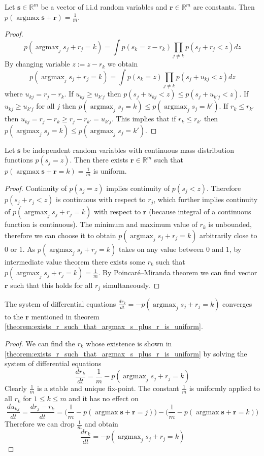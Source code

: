 \documentclass[oneside,english,logo]{amuthesis}
\DeclareMathOperator*{\argmax}{argmax}
\begin{document}
\begin{theorem}
Let $\boldsymbol{s} \in \mathbb{R}^m$ be a vector of i.i.d random variables and $\boldsymbol{r}\in \mathbb{R}^m$ are constants. Then $p(\argmax \boldsymbol{s}+\boldsymbol{r}) = \frac{1}{m}$. 
\end{theorem}
\begin{proof}
\[
p(\argmax_j s_j+r_j=k) = \int p(s_k=z-r_k)\prod_{j\ne k} p(s_j+r_j< z) dz
\] 
By changing variable  $z := z-r_k$ we obtain
\[	
p(\argmax_j s_j+r_j=k) = \int  p(s_k=z) \prod_{j\ne k} p(s_j + u_{kj} < z) dz 
\]
where $u_{kj}=r_j-r_k$. If $u_{kj} \ge u_{k'j}$ then $p(s_j + u_{kj} < z) \le p(s_j + u_{k'j}< z)$. If $u_{kj} \ge u_{k'j}$  for all $j$ then $p(\argmax_j s_j=k) \le p(\argmax_j s_j=k')$. If $r_k \le r_{k'}$ then $u_{kj} = r_j-r_k \ge r_j-r_{k'} = u_{k'j}$. This implies that if $r_k \le r_{k'}$ then $p(\argmax_j s_j=k) \le p(\argmax_j s_j=k')$. 
\end{proof}
\fi
\begin{theorem}
\label{theorem:exists_r_such_that_argmax_s_plus_r_is_uniform}
Let $\boldsymbol{s}$ be independent random variables with continuous mass distribution functions $p(s_j=z)$.
Then there exists $\boldsymbol{r} \in \mathbb{R}^m$ such that $p(\argmax \boldsymbol{s}+\boldsymbol{r}=k)=\frac{1}{m}$ is uniform.
\end{theorem}
\begin{proof}
	Continuity of $p(s_j=z)$ implies continuity of $p(s_j < z)$. Therefore $p(s_j +r_j< z)$ is continuous with respect to $r_j$, which further implies continuity of  $p(\argmax_j s_j+r_j=k)$ with respect to $\boldsymbol{r}$ (because integral of a continuous function is continuous). The minimum and maximum value of $r_k$ is unbounded, therefore we can choose it to obtain $p(\argmax_j s_j+r_j=k)$ arbitrarily close to $0$ or $1$. As $p(\argmax_j s_j+r_j=k)$ takes on any value between $0$ and $1$, by intermediate value theorem there exists some $r_k$ such that  $p(\argmax_j s_j+r_j=k)=\frac{1}{m}$. By Poincaré–Miranda theorem we can find vector $\boldsymbol{r}$ such that this holds for all $r_j$ simultaneously.
\end{proof}
\begin{theorem}
The system of differential equations $\frac{d r_k}{d t} = -p(\argmax_j s_j + r_j = k)$ converges to the $\boldsymbol{r}$ mentioned in theorem \ref{theorem:exists_r_such_that_argmax_s_plus_r_is_uniform}. 
\end{theorem}
\begin{proof}
We can find the $r_k$ whose existence is shown in \ref{theorem:exists_r_such_that_argmax_s_plus_r_is_uniform} by solving the system of  differential equations
\[
\frac{d r_k}{d t} = \frac{1}{m}-p(\argmax_j s_j+r_j=k)
\]
Clearly $\frac{1}{m}$ is a stable and unique fix-point. 
The constant $\frac{1}{m}$ is uniformly applied to all $r_k$ for $1 \le k \le m$ and it has no effect on 
\[
\frac{du_{kj}}{dt}=\frac{dr_j-r_k}{dt} = \big(\frac{1}{m}-p(\argmax \boldsymbol{s}+\boldsymbol{r}=j)\big)-\big(\frac{1}{m}-p(\argmax \boldsymbol{s}+\boldsymbol{r}=k)\big)
\]
Therefore we can drop $\frac{1}{m}$ and obtain 
\[
\frac{d r_k}{d t} = -p(\argmax_j s_j+r_j=k)
\]
\end{proof}
\end{document}

